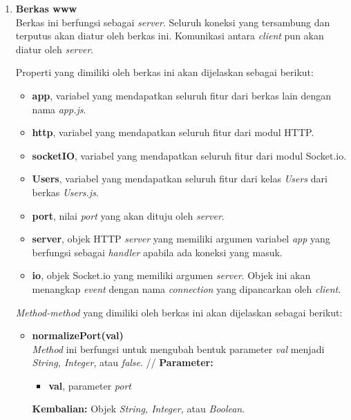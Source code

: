\begin{enumerate}
\begin{enumerate}
\begin{itemize}
		\end{itemize}
	
		\item \textbf{Berkas www} \\
		Berkas ini berfungsi sebagai \textit{server}. Seluruh koneksi yang tersambung dan terputus akan diatur oleh berkas ini. Komunikasi antara \textit{client} pun akan diatur oleh \textit{server}.
		
		Properti yang dimiliki oleh berkas ini akan dijelaskan sebagai berikut:
		\begin{itemize}
			\item \textbf{app}, variabel yang mendapatkan seluruh fitur dari berkas lain dengan nama \textit{app.js}.
			\item \textbf{http}, variabel yang mendapatkan seluruh fitur dari modul HTTP.
			\item \textbf{socketIO}, variabel yang mendapatkan seluruh fitur dari modul Socket.io.
			\item \textbf{{Users}}, variabel yang mendapatkan seluruh fitur dari kelas \textit{Users} dari berkas \textit{Users.js}.
			\item \textbf{port}, nilai \textit{port} yang akan dituju oleh \textit{server}.
			\item \textbf{server}, objek HTTP \textit{server} yang memiliki argumen variabel \textit{app} yang berfungsi sebagai \textit{handler} apabila ada koneksi yang masuk.
			\item \textbf{io}, objek Socket.io yang memiliki argumen \textit{server}. Objek ini akan menangkap \textit{event} dengan nama \textit{connection} yang dipancarkan oleh \textit{client}.
		\end{itemize}
	
		\textit{Method-method} yang dimiliki oleh berkas ini akan dijelaskan sebagai berikut:
		\begin{itemize}
			\item \textbf{normalizePort(val)} \\
			\textit{Method} ini berfungsi untuk mengubah bentuk parameter \textit{val} menjadi \textit{String, Integer}, atau \textit{false}. //
			\textbf{Parameter:}
			\begin{itemize}
				\item \textbf{val}, parameter \textit{port}
			\end{itemize}
			\textbf{Kembalian:} Objek \textit{String, Integer,} atau \textit{Boolean}. 
			
		\end{itemize}
	

\end{enumerate}
\end{enumerate}
